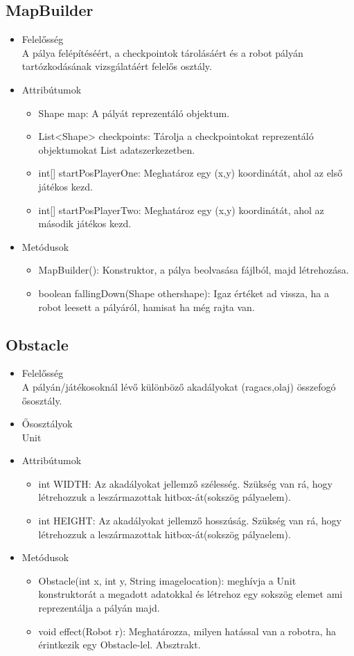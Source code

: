 \subsection{MapBuilder}
\begin{itemize}
\item Felelősség\\
A pálya felépítéséért, a checkpointok tárolásáért és a robot pályán tartózkodásának vizsgálatáért felelős osztály.
\item Attribútumok
	\begin{itemize}
		\item Shape map: A pályát reprezentáló objektum. 
		\item List<Shape> checkpoints: Tárolja a checkpointokat reprezentáló objektumokat List adatszerkezetben.
		\item int[] startPosPlayerOne: Meghatároz egy (x,y) koordinátát, ahol az első játékos kezd.
		\item int[] startPosPlayerTwo: Meghatároz egy (x,y) koordinátát, ahol az második játékos kezd.
	\end{itemize}
\item Metódusok
	\begin{itemize}
		\item MapBuilder(): Konstruktor, a pálya beolvasása fájlból, majd létrehozása.
		\item boolean fallingDown(Shape othershape): Igaz értéket ad vissza, ha a robot leesett a pályáról, hamisat ha még rajta van.
	\end{itemize}
\end{itemize}

\subsection{Obstacle}
\begin{itemize}
\item Felelősség\\
A pályán/játékosoknál lévő különböző akadályokat (ragacs,olaj) összefogó ősosztály.
\item Ősosztályok\\
Unit
\item Attribútumok
	\begin{itemize}
		\item int WIDTH: Az akadályokat jellemző szélesség. Szükség van rá, hogy létrehozzuk a leszármazottak hitbox-át(sokszög pályaelem).
		\item int HEIGHT: Az akadályokat jellemző hosszúság. Szükség van rá, hogy létrehozzuk a leszármazottak hitbox-át(sokszög pályaelem).
	\end{itemize}
\item Metódusok
	\begin{itemize}
		\item Obstacle(int x, int y, String imagelocation): meghívja a Unit konstruktorát a megadott adatokkal és létrehoz egy sokszög elemet ami reprezentálja a pályán majd.
		\item void effect(Robot r): Meghatározza, milyen hatással van a robotra, ha érintkezik egy Obstacle-lel. Absztrakt.
	\end{itemize}
\end{itemize}



